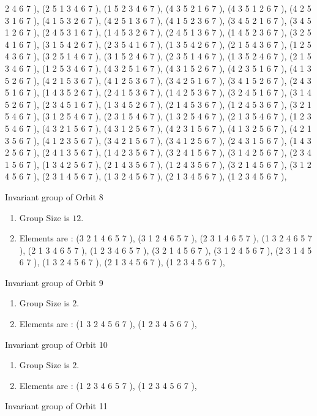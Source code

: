 \documentclass[12pt]{article}
\begin{document}
\begin{enumerate}
2 4 6 7  ), (2 5 1 3 4 6 7  ), (1 5 2 3 4 6 7  ), (4 3 5 2 1 6 7  ), (4 3 5 1 2 6 7  ), (4 2 5 3 1 6 7  ), (4 1 5 3 2 6 7  ), (4 2 5 1 3 6 7  ), (4 1 5 2 3 6 7  ), (3 4 5 2 1 6 7  ), (3 4 5 1 2 6 7  ), (2 4 5 3 1 6 7  ), (1 4 5 3 2 6 7  ), (2 4 5 1 3 6 7  ), (1 4 5 2 3 6 7  ), (3 2 5 4 1 6 7  ), (3 1 5 4 2 6 7  ), (2 3 5 4 1 6 7  ), (1 3 5 4 2 6 7  ), (2 1 5 4 3 6 7  ), (1 2 5 4 3 6 7  ), (3 2 5 1 4 6 7  ), (3 1 5 2 4 6 7  ), (2 3 5 1 4 6 7  ), (1 3 5 2 4 6 7  ), (2 1 5 3 4 6 7  ), (1 2 5 3 4 6 7  ), (4 3 2 5 1 6 7  ), (4 3 1 5 2 6 7  ), (4 2 3 5 1 6 7  ), (4 1 3 5 2 6 7  ), (4 2 1 5 3 6 7  ), (4 1 2 5 3 6 7  ), (3 4 2 5 1 6 7  ), (3 4 1 5 2 6 7  ), (2 4 3 5 1 6 7  ), (1 4 3 5 2 6 7  ), (2 4 1 5 3 6 7  ), (1 4 2 5 3 6 7  ), (3 2 4 5 1 6 7  ), (3 1 4 5 2 6 7  ), (2 3 4 5 1 6 7  ), (1 3 4 5 2 6 7  ), (2 1 4 5 3 6 7  ), (1 2 4 5 3 6 7  ), (3 2 1 5 4 6 7  ), (3 1 2 5 4 6 7  ), (2 3 1 5 4 6 7  ), (1 3 2 5 4 6 7  ), (2 1 3 5 4 6 7  ), (1 2 3 5 4 6 7  ), (4 3 2 1 5 6 7  ), (4 3 1 2 5 6 7  ), (4 2 3 1 5 6 7  ), (4 1 3 2 5 6 7  ), (4 2 1 3 5 6 7  ), (4 1 2 3 5 6 7  ), (3 4 2 1 5 6 7  ), (3 4 1 2 5 6 7  ), (2 4 3 1 5 6 7  ), (1 4 3 2 5 6 7  ), (2 4 1 3 5 6 7  ), (1 4 2 3 5 6 7  ), (3 2 4 1 5 6 7  ), (3 1 4 2 5 6 7  ), (2 3 4 1 5 6 7  ), (1 3 4 2 5 6 7  ), (2 1 4 3 5 6 7  ), (1 2 4 3 5 6 7  ), (3 2 1 4 5 6 7  ), (3 1 2 4 5 6 7  ), (2 3 1 4 5 6 7  ), (1 3 2 4 5 6 7  ), (2 1 3 4 5 6 7  ), (1 2 3 4 5 6 7  ), 
\end{enumerate}
Invariant group of Orbit 8
\begin{enumerate}
\item Group Size is $12$.
\item Elements are : (3 2 1 4 6 5 7  ), (3 1 2 4 6 5 7  ), (2 3 1 4 6 5 7  ), (1 3 2 4 6 5 7  ), (2 1 3 4 6 5 7  ), (1 2 3 4 6 5 7  ), (3 2 1 4 5 6 7  ), (3 1 2 4 5 6 7  ), (2 3 1 4 5 6 7  ), (1 3 2 4 5 6 7  ), (2 1 3 4 5 6 7  ), (1 2 3 4 5 6 7  ), 
\end{enumerate}
Invariant group of Orbit 9
\begin{enumerate}
\item Group Size is $2$.
\item Elements are : (1 3 2 4 5 6 7  ), (1 2 3 4 5 6 7  ), 
\end{enumerate}
Invariant group of Orbit 10
\begin{enumerate}
\item Group Size is $2$.
\item Elements are : (1 2 3 4 6 5 7  ), (1 2 3 4 5 6 7  ), 
\end{enumerate}
Invariant group of Orbit 11
\end{document}
